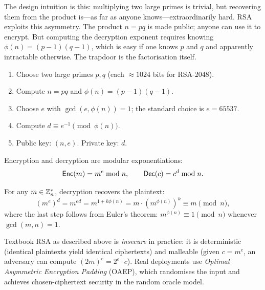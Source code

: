 The design intuition is this: multiplying two large primes is trivial, but recovering them from the product is---as far as anyone knows---extraordinarily hard.  RSA exploits this asymmetry.  The product $n = pq$ is made public; anyone can use it to encrypt.  But computing the decryption exponent requires knowing $\phi(n) = (p-1)(q-1)$, which is easy if one knows $p$ and $q$ and apparently intractable otherwise.  The trapdoor is the factorisation itself.

\begin{definition}
\label{def:rsa-keygen}
\begin{enumerate}
\item Choose two large primes $p, q$ (each $\approx 1024$ bits for RSA-2048).
\item Compute $n = pq$ and $\phi(n) = (p-1)(q-1)$.
\item Choose $e$ with $\gcd(e, \phi(n)) = 1$; the standard choice is $e = 65537$.
\item Compute $d \equiv e^{-1} \pmod{\phi(n)}$.
\item Public key: $(n, e)$.  Private key: $d$.
\end{enumerate}
\end{definition}

Encryption and decryption are modular exponentiations:
\begin{equation}
\label{eq:rsa}
\mathsf{Enc}(m) = m^e \bmod n, \qquad \mathsf{Dec}(c) = c^d \bmod n.
\end{equation}

\begin{theorem}
\label{thm:rsa-correct}
For any $m \in \mathbb{Z}_n^*$, decryption recovers the plaintext:
\begin{equation}
(m^e)^d = m^{ed} = m^{1 + k\phi(n)} = m \cdot (m^{\phi(n)})^k \equiv m \pmod{n},
\end{equation}
where the last step follows from Euler's theorem: $m^{\phi(n)} \equiv 1 \pmod{n}$ whenever $\gcd(m, n) = 1$.
\end{theorem}

Textbook RSA as described above is \emph{insecure} in practice: it is deterministic (identical plaintexts yield identical ciphertexts) and malleable (given $c = m^e$, an adversary can compute $(2m)^e = 2^e \cdot c$).  Real deployments use \emph{Optimal Asymmetric Encryption Padding} (OAEP), which randomises the input and achieves chosen-ciphertext security in the random oracle model.

